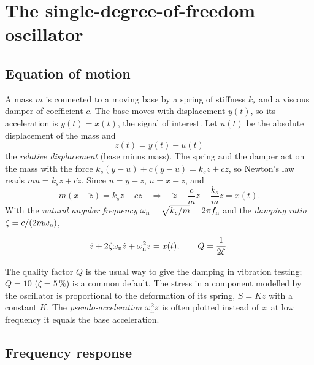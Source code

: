 \section{The single-degree-of-freedom oscillator}\label{sec:oscillator}

\subsection{Equation of motion}

A mass $m$ is connected to a moving base by a spring of stiffness $k_s$ and a viscous damper of
coefficient $c$. The base moves with displacement $y(t)$, so its acceleration is $\ddot y(t) =
x(t)$, the signal of interest. Let $u(t)$ be the absolute displacement of the mass and
\begin{equation}
  z(t) = y(t) - u(t)
\end{equation}
the \emph{relative displacement} (base minus mass). The spring and the damper act on the mass with
the force $k_s(y-u) + c(\dot y-\dot u) = k_s z + c\dot z$, so Newton's law reads $m\ddot u = k_s z +
c\dot z$. Since $u = y - z$, $\ddot u = x - \ddot z$, and
\begin{equation}
  m(x - \ddot z) = k_s z + c \dot z
  \quad\Longrightarrow\quad
  \ddot z + \frac{c}{m}\dot z + \frac{k_s}{m} z = x(t).
\end{equation}
With the \emph{natural angular frequency} $\omega_{\mathrm{n}} = \sqrt{k_s/m} = 2\pi f_{\mathrm{n}}$ and the \emph{damping
ratio} $\zeta = c/(2m\omega_{\mathrm{n}})$,
\begin{result}
\begin{equation}\label{eq:sdof}
  \ddot z + 2\zeta\omega_{\mathrm{n}}\dot z + \omega_{\mathrm{n}}^2 z = x(t), \qquad Q = \frac{1}{2\zeta}.
\end{equation}
\end{result}
The quality factor $Q$ is the usual way to give the damping in vibration testing; $Q=10$ ($\zeta =
5\,\%$) is a common default. The stress in a component modelled by the oscillator is proportional to
the deformation of its spring, $S = K z$ with a constant $K$. The \emph{pseudo-acceleration}
$\omega_{\mathrm{n}}^2 z$ is often plotted instead of $z$: at low frequency it equals the base acceleration.

\subsection{Frequency response}

